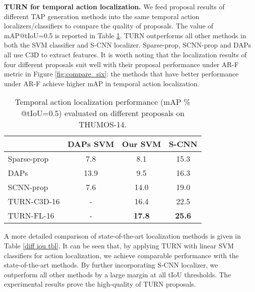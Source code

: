 \documentclass[10pt,twocolumn,letterpaper]{article}
\begin{document}
\textbf{TURN for temporal action localization.} We feed proposal results of different TAP generation methods into the same temporal action localizers/classifiers to compare the quality of proposals. The value of mAP@tIoU=0.5 is reported in Table \ref{diff prop tbl}. TURN outperforms all other methods in both the SVM classifier and S-CNN localizer. Sparse-prop, SCNN-prop and DAPs all use C3D to extract features. It is worth noting that the localization results of four different proposals suit well with their proposal performance under AR-F metric in Figure \ref{fig:compare_six}: the methods that have better performance under AR-F achieve higher mAP in temporal action localization.

\begin{table}[h]\small
\centering
\caption{Temporal action localization performance (mAP \% @tIoU=0.5) evaluated on different proposals on THUMOS-14.}
\label{diff prop tbl}
\begin{tabular}{l|ccc}
\hline
\multicolumn{1}{l|}{} & \multicolumn{1}{l}{DAPs SVM\cite{escorcia2016daps}} & \multicolumn{1}{l}{Our SVM} & \multicolumn{1}{l}{S-CNN} \\ \hline
Sparse-prop\cite{Heilbron_2016_CVPR}          & 7.8                          & 8.1                         & 15.3                     \\ \hline
DAPs\cite{escorcia2016daps}                 & 13.9                         & 9.5                         & 16.3                     \\ \hline
SCNN-prop\cite{Shou_2016_CVPR}            & 7.6\protect\footnotemark                          & 14.0                        & 19.0                     \\ \hline
TURN-C3D-16                 & -                            & 16.4               & 22.5            \\ \hline
TURN-FL-16                 & -                            & \textbf{17.8}               & \textbf{25.6}            \\ \hline
\end{tabular}
\end{table}
\addtocounter{footnote}{0}

A more detailed comparison of state-of-the-art localization methods is given in Table \ref{diff iou tbl}. It can be seen that, by applying TURN with linear SVM classifiers for action localization, we achieve comparable performance with the state-of-the-art methods. By further incorporating S-CNN localizer, we outperform all other methods by a large margin at all tIoU thresholds. The experimental results prove the high-quality of TURN proposals.
\end{document}

